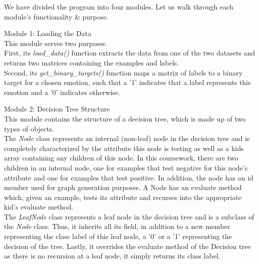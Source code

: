 We have divided the program into four modules. Let us walk through each module's functionality \& purpose.

Module 1: Loading the Data \\
This module serves two purposes.\\
First, its \emph{load\_data()} function extracts the data from one of the two datasets
and returns two matrices containing the examples and labels. \\
Second, its \emph{get\_binary\_targets()} function maps a matrix of labels to a binary target for a chosen emotion,
such that a '1' indicates that a label represents this emotion and a '0' indicates otherwise.

Module 2: Decision Tree Structure \\
This module contains the structure of a decision tree, which is made up of two types of objects. \\
The \emph{Node} class represents an internal (non-leaf) node in the decision tree and is completely characterized by the attribute
this node is testing as well as a kids array containing any children of this node. In this coursework, there are two children
in an internal node, one for examples that test negative for this node's attribute and one for examples that test positive.
In addition, the node has an id member used for graph generation purposes.
A Node has an evaluate method which, given an example, tests its attribute and recurses into the appropriate kid's evaluate method. \\
The \emph{LeafNode} class represents a leaf node in the decision tree and is a subclass of the \emph{Node} class.
Thus, it inherits all its field, in addition to a new member representing the class label of this leaf node,
a '0' or a '1' representing the decision of the tree.
Lastly, it overrides the evaluate method of the Decision tree as there is no recursion at a leaf node, it simply returns its class label.\\


